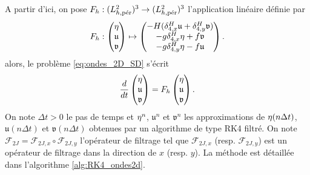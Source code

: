 A partir d'ici, on pose $F_h : (L_{h,\per}^2)^3 \rightarrow (L_{h,\per}^2)^3$ l'application linéaire définie par
\begin{equation}
F_h : \begin{pmatrix}
\etafrak \\ \mathfrak{u} \\ \mathfrak{v}
\end{pmatrix} \mapsto \begin{pmatrix}
- H (\delta_{4,x}^H \mathfrak{u} + \delta_{4,y}^H \mathfrak{v}) \\
- g \delta_{4,x}^H \etafrak + f \mathfrak{v} \\
- g \delta_{4,y}^H \etafrak - f \mathfrak{u}
\end{pmatrix}.
\end{equation}
alors, le problème \eqref{eq:ondes_2D_SD} s'écrit
\begin{equation}
\dfrac{d}{dt} \begin{pmatrix}
\etafrak \\ \mathfrak{u} \\ \mathfrak{v}
\end{pmatrix} = F_h\begin{pmatrix}
\etafrak \\ \mathfrak{u} \\ \mathfrak{v}
\end{pmatrix}.
\end{equation}
On note $\Delta t>0$ le pas de temps et $\etafrak^n$, $\mathfrak{u}^n$ et $\mathfrak{v}^n$ les approximations de $\etafrak(n\Delta t)$, $\mathfrak{u}(n \Delta t)$ et $\mathfrak{v}(n \Delta t)$ obtenues par un algorithme de type RK4 filtré. On note $\mathcal{F}_{2J} = \mathcal{F}_{2J,x} \circ \mathcal{F}_{2J,y}$ l'opérateur de filtrage tel que $\mathcal{F}_{2J,x}$ (resp. $\mathcal{F}_{2J,y}$) est un opérateur de filtrage dans la direction de $x$ (resp. $y$). La méthode est détaillée dans l'algorithme \ref{alg:RK4_ondes2d}.

